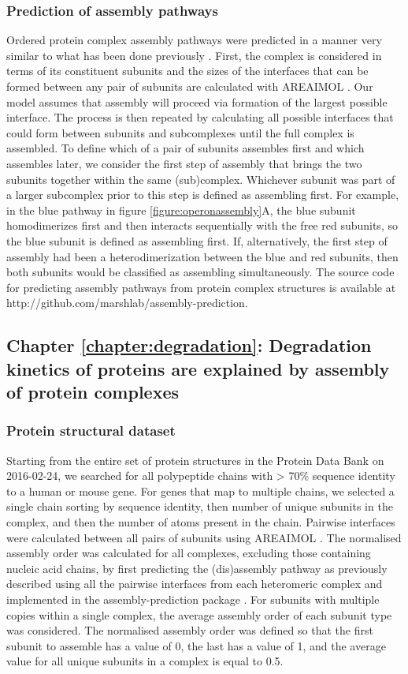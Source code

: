 \documentclass[a4paper,11pt,twoside,openright]{scrbook}
\begin{document}
\subsubsection{Prediction of assembly pathways}
Ordered protein complex assembly pathways were predicted in a manner very similar to what has been done previously \cite{Marsh2013}. First, the complex is considered in terms of its constituent subunits and the sizes of the interfaces that can be formed between any pair of subunits are calculated with AREAIMOL \cite{Winn2011}. Our model assumes that assembly will proceed via formation of the largest possible interface. The process is then repeated by calculating all possible interfaces that could form between subunits and subcomplexes until the full complex is assembled. To define which of a pair of subunits assembles first and which assembles later, we consider the first step of assembly that brings the two subunits together within the same (sub)complex. Whichever subunit was part of a larger subcomplex prior to this step is defined as assembling first. For example, in the blue pathway in figure \ref{figure:operonassembly}A, the blue subunit homodimerizes first and then interacts sequentially with the free red subunits, so the blue subunit is defined as assembling first. If, alternatively, the first step of assembly had been a heterodimerization between the blue and red subunits, then both subunits would be classified as assembling simultaneously. The source code for predicting assembly pathways from protein complex structures is available at http://github.com/marshlab/assembly-prediction.

\subsection{Chapter \ref*{chapter:degradation}: Degradation kinetics of proteins are explained by assembly of protein complexes}

\subsubsection{Protein structural dataset}
Starting from the entire set of protein structures in the Protein Data Bank on 2016-02-24, we searched for all polypeptide chains with > 70\% sequence identity to a human or mouse gene. For genes that map to multiple chains, we selected a single chain sorting by sequence identity, then number of unique subunits in the complex, and then the number of atoms present in the chain. Pairwise interfaces were calculated between all pairs of subunits using AREAIMOL \cite{Winn2011}. The normalised assembly order was calculated for all complexes, excluding those containing nucleic acid chains, by first predicting the (dis)assembly pathway as previously described using all the pairwise interfaces from each heteromeric complex \cite{Marsh2013} and implemented in the assembly-prediction package \cite{Wells2016}. For subunits with multiple copies within a single complex, the average assembly order of each subunit type was considered. The normalised assembly order was defined so that the first subunit to assemble has a value of 0, the last has a value of 1, and the average value for all unique subunits in a complex is equal to 0.5.
\end{document}
